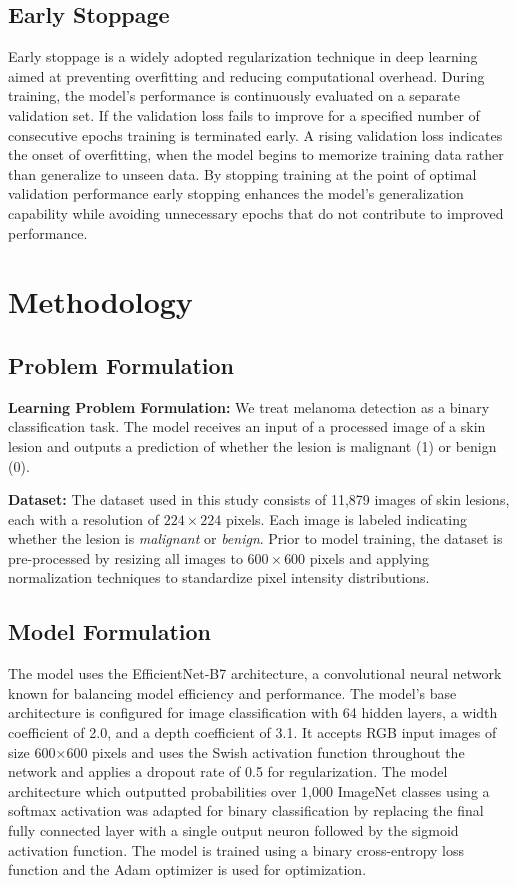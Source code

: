 \documentclass[conference]{IEEEtran}
\begin{document}
\subsection{Early Stoppage}

Early stoppage is a widely adopted regularization technique in deep learning aimed at preventing overfitting and reducing computational overhead. During training, the model’s performance is continuously evaluated on a separate validation set. If the validation loss fails to improve for a specified number of consecutive epochs training is terminated early. A rising validation loss indicates the onset of overfitting, when the model begins to memorize training data rather than generalize to unseen data. By stopping training at the point of optimal validation performance early stopping enhances the model’s generalization capability while avoiding unnecessary epochs that do not contribute to improved performance.



\section{Methodology}

\subsection{Problem Formulation}
\textbf{Learning Problem Formulation:}
We treat melanoma detection as a binary classification task. The model receives an input of a processed image of a skin lesion and outputs a prediction of whether the lesion is malignant (1) or benign (0).

\textbf{Dataset:}
The dataset used in this study consists of 11,879 images of skin lesions, each with a resolution of $224 \times 224$ pixels. Each image is labeled indicating whether the lesion is \textit{malignant} or \textit{benign}. Prior to model training, the dataset is pre-processed by resizing all images to $600 \times 600$ pixels and applying normalization techniques to standardize pixel intensity distributions.


\subsection{Model Formulation}
The model uses the EfficientNet-B7 architecture, a convolutional neural network known for balancing model efficiency and performance. The model's base architecture is configured for image classification with 64 hidden layers, a width coefficient of 2.0, and a depth coefficient of 3.1. It accepts RGB input images of size 600×600 pixels and uses the Swish activation function throughout the network and applies a dropout rate of 0.5 for regularization. The model architecture which outputted probabilities over 1,000 ImageNet classes using a softmax activation was adapted for binary classification by replacing the final fully connected layer with a single output neuron followed by the sigmoid activation function. The model is trained using a binary cross-entropy loss function and the Adam optimizer is used for optimization.
\end{document}
